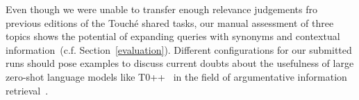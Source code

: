 Even though we were unable to transfer enough relevance judgements fro previous editions of the Touché shared tasks, our manual assessment of three topics shows the potential of expanding queries with synonyms and contextual information~(c.f. Section~\ref{evaluation}).
Different configurations for our submitted runs should pose examples to discuss current doubts about the usefulness of large zero-shot language models like T0++~\cite{SanhWRBSACSLRDBXTSSKCNDCJWMSYPBWNRSSFFTBGBWR2021} in the field of argumentative information retrieval~\cite{ShahB2022}.
